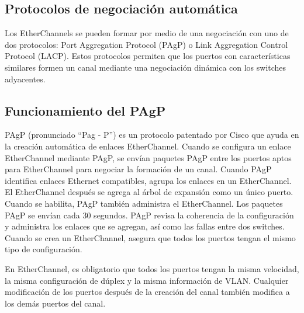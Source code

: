\documentclass[
	12pt, %
	fleqn, %
	a4paper, %
	oneside, %
]{LegrandOrangeBook}
\begin{document}
\subsection*{Protocolos de negociación automática}
Los EtherChannels se pueden formar por medio de una negociación con uno de dos  protocolos: Port Aggregation Protocol (PAgP) o Link Aggregation Control Protocol (LACP).  Estos protocolos permiten que los puertos con características similares formen un canal  mediante una negociación dinámica con los switches adyacentes.
\subsection{Funcionamiento del PAgP}
PAgP (pronunciado ``Pag - P'') es un protocolo patentado por Cisco que ayuda en la creación  automática de enlaces EtherChannel. Cuando se configura un enlace EtherChannel mediante PAgP,  se envían paquetes PAgP entre los puertos aptos para EtherChannel para negociar la formación de un  canal. Cuando PAgP identifica enlaces Ethernet compatibles, agrupa los enlaces en un EtherChannel.  El EtherChannel después se agrega al árbol de expansión como un único puerto.\\
Cuando se habilita, PAgP también administra el EtherChannel. Los paquetes PAgP se envían cada 30  segundos. PAgP revisa la coherencia de la configuración y administra los enlaces que se agregan, así  como las fallas entre dos switches. Cuando se crea un EtherChannel, asegura que todos los puertos  tengan el mismo tipo de configuración.
\begin{notation}
En EtherChannel, es obligatorio que todos los puertos tengan la misma velocidad, la misma  configuración de dúplex y la misma información de VLAN. Cualquier modificación de los puertos  después de la creación del canal también modifica a los demás puertos del canal.
\end{notation}
\end{document}
